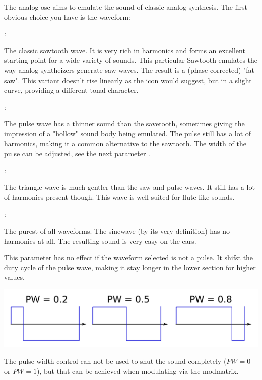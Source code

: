 The analog osc aims to emulate the sound of classic analog synthesis. The first obvious choice you have is the waveform:


:

The classic sawtooth wave. It is very rich in harmonics and forms an excellent starting point for a wide variety of sounds. This particular Sawtooth emulates the way analog syntheizers generate saw-waves. The result is a (phase-corrected) "fat-saw". This variant doesn't rise linearly as the icon would suggest, but in a slight curve, providing a different tonal character.

:

The pulse wave has a thinner sound than the savetooth, sometimes giving the impression of a "hollow" sound body being emulated. The pulse still has a lot of harmonics, making it a common alternative to the sawtooth. The width of the pulse can be adjusted, see the next parameter .

:

The triangle wave is much gentler than the saw and pulse waves. It still has a lot of harmonics present though. This wave is well suited for flute like sounds.

:

The purest of all waveforms. The sinewave (by its very definition) has no harmonics at all. The resulting sound is very easy on the ears.

This parameter has no effect if the waveform selected is not a pulse. It shifst the duty cycle of the pulse wave, making it stay longer in the lower section for higher values.

\begin{center}
    \includegraphics[width=\textwidth]{graphics/PWM.png}
\end{center}

The pulse width control can not be used to shut the sound completely ($PW = 0$ or $PW = 1$), but that can be achieved when modulating via the modmatrix.


